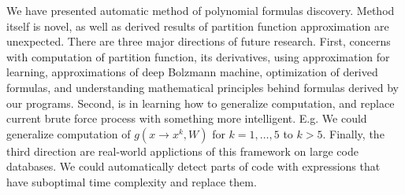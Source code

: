 We have presented automatic method of polynomial formulas discovery. Method itself is novel, as well 
as derived results of partition function approximation are unexpected.
There are three major directions of future research. First, concerns with computation of partition function,
its derivatives, using approximation for learning, 
approximations of deep Bolzmann machine, optimization of derived formulas, and 
understanding mathematical principles behind formulas derived by our programs. Second, is in 
learning how to generalize computation, and replace current brute force process with something more
intelligent. E.g. We could generalize computation of $g(x \rightarrow x^k, W)$ for $k = 1, \dots, 5$ to
$k > 5$. Finally, the third direction are real-world applictions of this framework on large code
databases. We could automatically detect parts of code with expressions that have suboptimal time complexity
and replace them. 

